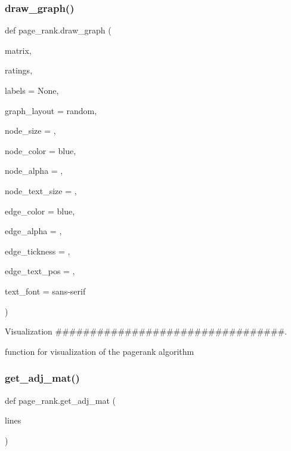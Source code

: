 \subsubsection{\texorpdfstring{draw\+\_\+graph()}{draw\_graph()}}
{\footnotesize\ttfamily def page\+\_\+rank.\+draw\+\_\+graph (\begin{DoxyParamCaption}\item[{}]{matrix,  }\item[{}]{ratings,  }\item[{}]{labels = {\ttfamily None},  }\item[{}]{graph\+\_\+layout = {\ttfamily \textquotesingle{}random\textquotesingle{}},  }\item[{}]{node\+\_\+size = {},  }\item[{}]{node\+\_\+color = {\ttfamily \textquotesingle{}blue\textquotesingle{}},  }\item[{}]{node\+\_\+alpha = {},  }\item[{}]{node\+\_\+text\+\_\+size = {},  }\item[{}]{edge\+\_\+color = {\ttfamily \textquotesingle{}blue\textquotesingle{}},  }\item[{}]{edge\+\_\+alpha = {},  }\item[{}]{edge\+\_\+tickness = {},  }\item[{}]{edge\+\_\+text\+\_\+pos = {},  }\item[{}]{text\+\_\+font = {\ttfamily \textquotesingle{}sans-\/serif\textquotesingle{}} }\end{DoxyParamCaption})}



Visualization \#\#\#\#\#\#\#\#\#\#\#\#\#\#\#\#\#\#\#\#\#\#\#\#\#\#\#\#\#\#\#\#\#. 

\begin{DoxyVerb}function for visualization of the pagerank algorithm \end{DoxyVerb}
 \mbox{\label{namespacepage__rank_acefb97fa474eeb038efcbe51e2e1f4e1}} 
\subsubsection{\texorpdfstring{get\+\_\+adj\+\_\+mat()}{get\_adj\_mat()}}
{\footnotesize\ttfamily def page\+\_\+rank.\+get\+\_\+adj\+\_\+mat (\begin{DoxyParamCaption}\item[{}]{lines }\end{DoxyParamCaption})}


